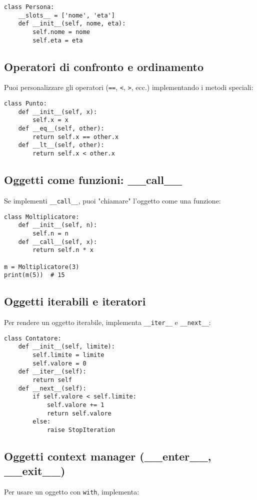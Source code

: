 \documentclass[a4paper,12pt]{article}
\begin{document}
\begin{lstlisting}
class Persona:
    __slots__ = ['nome', 'eta']
    def __init__(self, nome, eta):
        self.nome = nome
        self.eta = eta
\end{lstlisting}

\subsection*{Operatori di confronto e ordinamento}
Puoi personalizzare gli operatori (\texttt{==}, \texttt{<}, \texttt{>}, ecc.) implementando i metodi speciali:

\begin{lstlisting}
class Punto:
    def __init__(self, x):
        self.x = x
    def __eq__(self, other):
        return self.x == other.x
    def __lt__(self, other):
        return self.x < other.x
\end{lstlisting}

\subsection*{Oggetti come funzioni: \_\_call\_\_}
Se implementi \texttt{\_\_call\_\_}, puoi "chiamare" l'oggetto come una funzione:

\begin{lstlisting}
class Moltiplicatore:
    def __init__(self, n):
        self.n = n
    def __call__(self, x):
        return self.n * x

m = Moltiplicatore(3)
print(m(5))  # 15
\end{lstlisting}

\subsection*{Oggetti iterabili e iteratori}
Per rendere un oggetto iterabile, implementa \texttt{\_\_iter\_\_} e \texttt{\_\_next\_\_}:

\begin{lstlisting}
class Contatore:
    def __init__(self, limite):
        self.limite = limite
        self.valore = 0
    def __iter__(self):
        return self
    def __next__(self):
        if self.valore < self.limite:
            self.valore += 1
            return self.valore
        else:
            raise StopIteration
\end{lstlisting}

\subsection*{Oggetti context manager (\_\_enter\_\_, \_\_exit\_\_)}
Per usare un oggetto con \texttt{with}, implementa:
\end{document}

